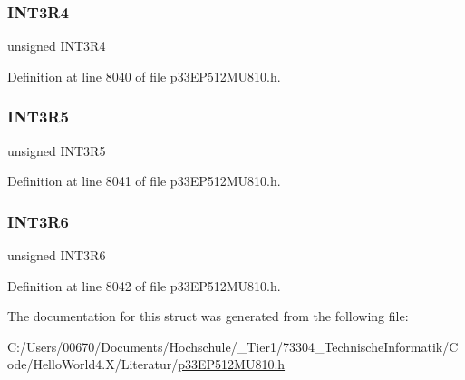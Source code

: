 \subsubsection{\texorpdfstring{I\+N\+T3\+R4}{INT3R4}}
{\footnotesize\ttfamily unsigned I\+N\+T3\+R4}



Definition at line 8040 of file p33\+E\+P512\+M\+U810.\+h.

\mbox{\label{structtag_r_p_i_n_r1_b_i_t_s_a0290df3e0a6c02759387bfb9b822e70f}} 
\subsubsection{\texorpdfstring{I\+N\+T3\+R5}{INT3R5}}
{\footnotesize\ttfamily unsigned I\+N\+T3\+R5}



Definition at line 8041 of file p33\+E\+P512\+M\+U810.\+h.

\mbox{\label{structtag_r_p_i_n_r1_b_i_t_s_a9d82b018188007863bd9ea3e83a345d1}} 
\subsubsection{\texorpdfstring{I\+N\+T3\+R6}{INT3R6}}
{\footnotesize\ttfamily unsigned I\+N\+T3\+R6}



Definition at line 8042 of file p33\+E\+P512\+M\+U810.\+h.



The documentation for this struct was generated from the following file\+:\begin{DoxyCompactItemize}
\item 
C\+:/\+Users/00670/\+Documents/\+Hochschule/\+\_\+\+Tier1/73304\+\_\+\+Technische\+Informatik/\+Code/\+Hello\+World4.\+X/\+Literatur/\hyperlink{p33_e_p512_m_u810_8h}{p33\+E\+P512\+M\+U810.\+h}\end{DoxyCompactItemize}
